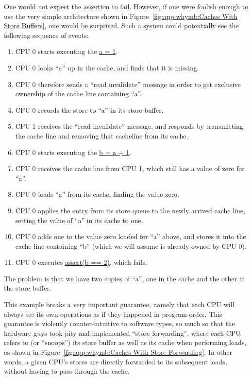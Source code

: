 One would not expect the assertion to fail.
However, if one were foolish enough to use the very simple architecture
shown in
Figure~\ref{fig:app:whymb:Caches With Store Buffers},
one would be surprised.
Such a system could potentially see the following sequence of events:
\begin{enumerate}
\item	CPU 0 starts executing the \url{a = 1}.
\item	CPU 0 looks ``a'' up in the cache, and finds that it is missing.
\item	CPU 0 therefore sends a ``read invalidate'' message in order to
	get exclusive ownership of the cache line containing ``a''.
\item	CPU 0 records the store to ``a'' in its store buffer.
\item	CPU 1 receives the ``read invalidate'' message, and responds
	by transmitting the cache line and removing that cacheline from
	its cache.
\item	CPU 0 starts executing the \url{b = a + 1}.
\item	CPU 0 receives the cache line from CPU 1, which still has
	a value of zero for ``a''.
\item	CPU 0 loads ``a'' from its cache, finding the value zero.
	\label{item:app:whymb:Need Store Buffer}
\item	CPU 0 applies the entry from its store queue to the newly
	arrived cache line, setting the value of ``a'' in its cache
	to one.
\item	CPU 0 adds one to the value zero loaded for ``a'' above,
	and stores it into the cache line containing ``b''
	(which we will assume is already owned by CPU 0).
\item	CPU 0 executes \url{assert(b == 2)}, which fails.
\end{enumerate}

The problem is that we have two copies of ``a'', one in the cache and
the other in the store buffer.

This example breaks a very important guarantee, namely that each CPU
will always see its own operations as if they happened in program order.
This guarantee is violently counter-intuitive to software types, so much so
that the hardware guys took pity and implemented ``store forwarding'',
where each CPU refers to (or ``snoops'') its store buffer as well
as its cache when performing loads, as shown in
Figure~\ref{fig:app:whymb:Caches With Store Forwarding}.
In other words, a given CPU's stores are directly forwarded to its
subsequent loads, without having to pass through the cache.

